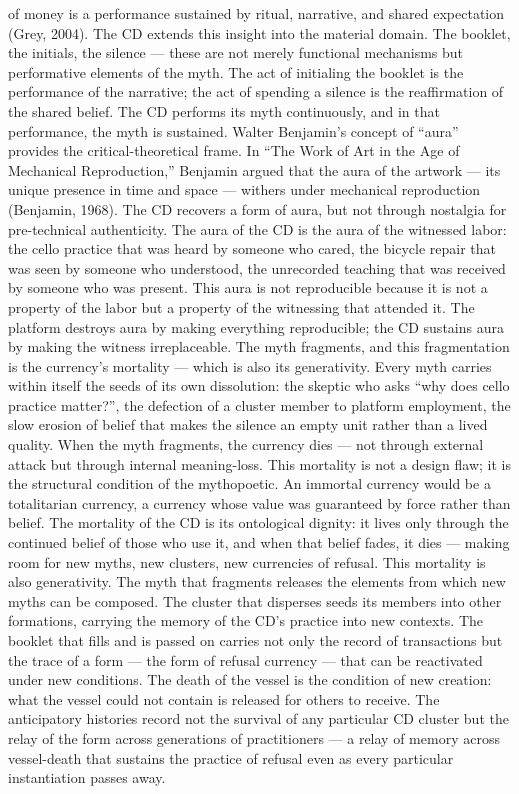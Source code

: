 of money is a performance sustained by ritual, narrative, and shared expectation (Grey, 2004). The CD extends this insight into the material domain. The booklet, the initials, the silence — these are not merely functional mechanisms but performative elements of the myth. The act of initialing the booklet is the performance of the narrative; the act of spending a silence is the reaffirmation of the shared belief. The CD performs its myth continuously, and in that performance, the myth is sustained. Walter Benjamin’s concept of “aura” provides the critical-theoretical frame. In “The Work of Art in the Age of Mechanical Reproduction,” Benjamin argued that the aura of the artwork — its unique presence in time and space — withers under mechanical reproduction (Benjamin, 1968). The CD recovers a form of aura, but not through nostalgia for pre-technical authenticity. The aura of the CD is the aura of the witnessed labor: the cello practice that was heard by someone who cared, the bicycle repair that was seen by someone who understood, the unrecorded teaching that was received by someone who was present. This aura is not reproducible because it is not a property of the labor but a property of the witnessing that attended it. The platform destroys aura by making everything reproducible; the CD sustains aura by making the witness irreplaceable. The myth fragments, and this fragmentation is the currency’s mortality — which is also its generativity. Every myth carries within itself the seeds of its own dissolution: the skeptic who asks “why does cello practice matter?”, the defection of a cluster member to platform employment, the slow erosion of belief that makes the silence an empty unit rather than a lived quality. When the myth fragments, the currency dies — not through external attack but through internal meaning-loss. This mortality is not a design flaw; it is the structural condition of the mythopoetic. An immortal currency would be a totalitarian currency, a currency whose value was guaranteed by force rather than belief. The mortality of the CD is its ontological dignity: it lives only through the continued belief of those who use it, and when that belief fades, it dies — making room for new myths, new clusters, new currencies of refusal. This mortality is also generativity. The myth that fragments releases the elements from which new myths can be composed. The cluster that disperses seeds its members into other formations, carrying the memory of the CD’s practice into new contexts. The booklet that fills and is passed on carries not only the record of transactions but the trace of a form — the form of refusal currency — that can be reactivated under new conditions. The death of the vessel is the condition of new creation: what the vessel could not contain is released for others to receive. The anticipatory histories record not the survival of any particular CD cluster but the relay of the form across generations of practitioners — a relay of memory across vessel-death that sustains the practice of refusal even as every particular instantiation passes away.

